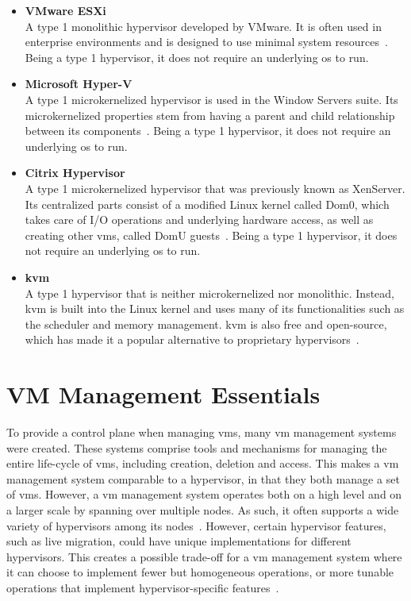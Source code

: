 \documentclass{kththesis}
\begin{document}
\begin{itemize}
    \item \textbf{VMware ESXi}\\
    A type 1 monolithic hypervisor developed by VMware. It is often used in enterprise environments and is designed to use minimal system resources\ \cite{hypervisor-comparion-2013}. Being a type 1 hypervisor, it does not require an underlying \Gls{os} to run. 
    \item \textbf{Microsoft Hyper-V}\\
    A type 1 microkernelized hypervisor is used in the Window Servers suite. Its microkernelized properties stem from having a parent and child relationship between its components\ \cite{hypervisor-comparion-2013, hypervisor-hyper-v-esxi}. Being a type 1 hypervisor, it does not require an underlying \Gls{os} to run.  
    \item \textbf{Citrix Hypervisor}\\
    A type 1 microkernelized hypervisor that was previously known as XenServer. Its centralized parts consist of a modified Linux kernel called Dom0, which takes care of I/O operations and underlying hardware access, as well as creating other \Glspl{vm}, called DomU guests\ \cite{hypervisor-xen, hypervisor-comparion-2013}. Being a type 1 hypervisor, it does not require an underlying \Gls{os} to run.  
    \item \textbf{\Gls{kvm}}\\
    A type 1 hypervisor that is neither microkernelized nor monolithic. Instead, \Gls{kvm} is built into the Linux kernel and uses many of its functionalities such as the scheduler and memory management. \Gls{kvm} is also free and open-source, which has made it a popular alternative to proprietary hypervisors\ \cite{hypervisor-comparion-2013, hypervisor-kvm}. 
\end{itemize}

\section{VM Management Essentials}
To provide a control plane when managing \Glspl{vm}, many \Gls{vm} management systems were created. These systems comprise tools and mechanisms for managing the entire life-cycle of \Glspl{vm}, including creation, deletion and access. This makes a \Gls{vm} management system comparable to a hypervisor, in that they both manage a set of \Glspl{vm}. However, a \Gls{vm} management system operates both on a high level and on a larger scale by spanning over multiple nodes. As such, it often supports a wide variety of hypervisors among its nodes\ \cite{cloudframeworks-and-hypervisors}. However, certain hypervisor features, such as live migration, could have unique implementations for different hypervisors. This creates a possible trade-off for a \Gls{vm} management system where it can choose to implement fewer but homogeneous operations, or more tunable operations that implement hypervisor-specific features\ \cite{openstack-opennebula-comparison}.
\end{document}
